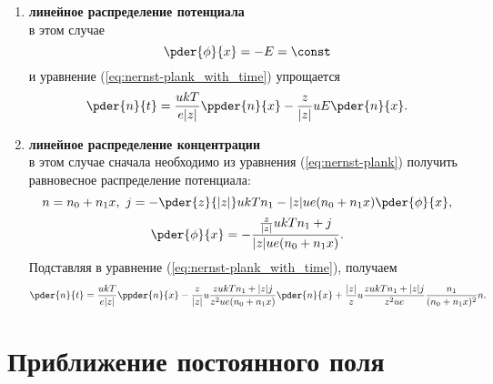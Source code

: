 \documentclass{hedwork}
\begin{document}
    \begin{enumerate}
        \item \textbf{линейное распределение потенциала}\\
            в этом случае
            \[
                \pder{\phi}{x} = -E = \const
            \]
            и уравнение (\ref{eq:nernst-plank_with_time}) упрощается
            \begin{equation}
                \pder{n}{t} = \frac{ukT}{e|z|}\ppder{n}{x} -
                    \frac{z}{|z|}uE\pder{n}{x}.
            \end{equation}
        \item \textbf{линейное распределение концентрации}\\
            в этом случае сначала необходимо из уравнения
            (\ref{eq:nernst-plank}) получить равновесное распределение
            потенциала:
            \[
                n = n_0 + n_1 x,\ j = -\pder{z}{|z|}ukTn_1 -
                    |z|ue(n_0+n_1x)\pder{\phi}{x},
            \]
            \[
                \pder{\phi}{x} = -\frac{\frac{z}{|z|}ukTn_1+j}{|z|ue(n_0+n_1x)}.
            \]
            Подставляя в уравнение (\ref{eq:nernst-plank_with_time}), получаем
            \begin{equation}
                \pder{n}{t} = \frac{ukT}{e|z|}\ppder{n}{x} -
                \frac{z}{|z|}u\frac{zukTn_1+|z|j}{z^2ue(n_0+n_1x)}\pder{n}{x}+
                \frac{|z|}{z}u\frac{zukTn_1+|z|j}{z^2ue}
                \frac{n_1}{(n_0+n_1x)^2}n.
            \end{equation}
    \end{enumerate}

\section{Приближение постоянного поля}
\end{document}
